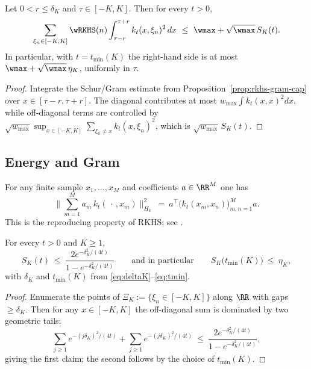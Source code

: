 \begin{lemma}\label{rkhs:lem:shift-window}
Let $0<r\le\delta_K$ and $\tau\in[-K,K]$. Then for every $t>0$,
\[
  \sum_{\xi_n\in[-K,K]} \wRKHS(n)\int_{\tau-r}^{\tau+r} k_t(x,\xi_n)^2\,dx
  \ \le\ \wmax+\sqrt{\wmax}\,S_K(t).
\]
In particular, with $t=t_{\min}(K)$ the right-hand side is at most $\wmax+\sqrt{\wmax}\,\eta_K$, uniformly in $\tau$.
\end{lemma}

\begin{proof}
Integrate the Schur/Gram estimate from Proposition~\ref{prop:rkhs-gram-cap} over $x\in[\tau-r,\tau+r]$.
The diagonal contributes at most $w_{\max}\int k_t(x,x)^2 dx$, while off-diagonal terms are controlled by
$\sqrt{w_{\max}}\sup_{x\in[-K,K]}\sum_{\xi_n\neq x} k_t(x,\xi_n)^2$, which is $\sqrt{w_{\max}}\,S_K(t)$.
\end{proof}

\subsection*{Energy and Gram}

\begin{lemma}\label{lem:rkhs-energy-primecap}
For any finite sample $x_1,\dots,x_M$ and coefficients $a\in\RR^M$ one has
\[
\Big\|\sum_{m=1}^M a_m\,k_t(\,\cdot\,,x_m)\Big\|_{H_k}^2
\ =\ a^\top \Big(k_t(x_m,x_n)\Big)_{m,n=1}^M a.
\]
This is the reproducing property of RKHS; see \cite{Aronszajn1950}.
\end{lemma}

\begin{lemma}\label{lem:rkhs-gram-off}
For every $t>0$ and $K\ge1$,
\[
S_K(t)\ \le\ \frac{2e^{-\delta_K^2/(4t)}}{1-e^{-\delta_K^2/(4t)}}
\qquad\text{and in particular}\qquad
S_K\big(t_{\min}(K)\big)\ \le\ \eta_K,
\]
with $\delta_K$ and $t_{\min}(K)$ from \eqref{eq:deltaK}--\eqref{eq:tmin}.
\end{lemma}

\begin{proof}
Enumerate the points of $\Xi_K:=\{\xi_n\in[-K,K]\}$ along $\RR$ with gaps $\ge\delta_K$.
Then for any $x\in[-K,K]$ the off-diagonal sum is dominated by two geometric tails:
\[
\sum_{j\ge1} e^{-(j\delta_K)^2/(4t)}+\sum_{j\ge1} e^{-(j\delta_K)^2/(4t)}
\ \le\ \frac{2e^{-\delta_K^2/(4t)}}{1-e^{-\delta_K^2/(4t)}},
\]
giving the first claim; the second follows by the choice of $t_{\min}(K)$.
\end{proof}

